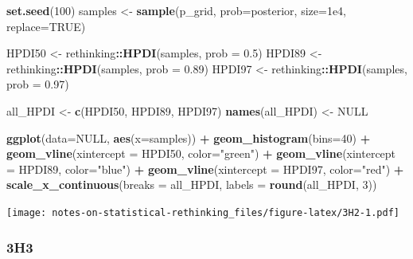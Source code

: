 \documentclass[
]{book}
\newenvironment{Shaded}{\begin{snugshade}}{\end{snugshade}}
\newcommand{\DataTypeTok}[1]{\textcolor[rgb]{0.13,0.29,0.53}{#1}}
\newcommand{\DecValTok}[1]{\textcolor[rgb]{0.00,0.00,0.81}{#1}}
\newcommand{\FloatTok}[1]{\textcolor[rgb]{0.00,0.00,0.81}{#1}}
\newcommand{\KeywordTok}[1]{\textcolor[rgb]{0.13,0.29,0.53}{\textbf{#1}}}
\newcommand{\NormalTok}[1]{#1}
\newcommand{\OperatorTok}[1]{\textcolor[rgb]{0.81,0.36,0.00}{\textbf{#1}}}
\newcommand{\OtherTok}[1]{\textcolor[rgb]{0.56,0.35,0.01}{#1}}
\newcommand{\StringTok}[1]{\textcolor[rgb]{0.31,0.60,0.02}{#1}}
\begin{document}
\begin{Shaded}
\begin{Highlighting}[]
\KeywordTok{set.seed}\NormalTok{(}\DecValTok{100}\NormalTok{)}
\NormalTok{samples \textless{}{-}}\StringTok{ }\KeywordTok{sample}\NormalTok{(p\_grid, }\DataTypeTok{prob=}\NormalTok{posterior, }\DataTypeTok{size=}\FloatTok{1e4}\NormalTok{, }\DataTypeTok{replace=}\OtherTok{TRUE}\NormalTok{)}

\NormalTok{HPDI50 \textless{}{-}}\StringTok{ }\NormalTok{rethinking}\OperatorTok{::}\KeywordTok{HPDI}\NormalTok{(samples, }\DataTypeTok{prob =} \FloatTok{0.5}\NormalTok{)}
\NormalTok{HPDI89 \textless{}{-}}\StringTok{ }\NormalTok{rethinking}\OperatorTok{::}\KeywordTok{HPDI}\NormalTok{(samples, }\DataTypeTok{prob =} \FloatTok{0.89}\NormalTok{)}
\NormalTok{HPDI97 \textless{}{-}}\StringTok{ }\NormalTok{rethinking}\OperatorTok{::}\KeywordTok{HPDI}\NormalTok{(samples, }\DataTypeTok{prob =} \FloatTok{0.97}\NormalTok{)}

\NormalTok{all\_HPDI \textless{}{-}}\StringTok{ }\KeywordTok{c}\NormalTok{(HPDI50, HPDI89, HPDI97)}
\KeywordTok{names}\NormalTok{(all\_HPDI) \textless{}{-}}\StringTok{ }\OtherTok{NULL}


\KeywordTok{ggplot}\NormalTok{(}\DataTypeTok{data=}\OtherTok{NULL}\NormalTok{, }\KeywordTok{aes}\NormalTok{(}\DataTypeTok{x=}\NormalTok{samples)) }\OperatorTok{+}\StringTok{ }
\StringTok{  }\KeywordTok{geom\_histogram}\NormalTok{(}\DataTypeTok{bins=}\DecValTok{40}\NormalTok{) }\OperatorTok{+}\StringTok{ }
\StringTok{  }\KeywordTok{geom\_vline}\NormalTok{(}\DataTypeTok{xintercept =}\NormalTok{ HPDI50, }\DataTypeTok{color=}\StringTok{"green"}\NormalTok{) }\OperatorTok{+}
\StringTok{  }\KeywordTok{geom\_vline}\NormalTok{(}\DataTypeTok{xintercept =}\NormalTok{ HPDI89, }\DataTypeTok{color=}\StringTok{"blue"}\NormalTok{) }\OperatorTok{+}\StringTok{ }
\StringTok{  }\KeywordTok{geom\_vline}\NormalTok{(}\DataTypeTok{xintercept =}\NormalTok{ HPDI97, }\DataTypeTok{color=}\StringTok{"red"}\NormalTok{) }\OperatorTok{+}
\StringTok{  }\KeywordTok{scale\_x\_continuous}\NormalTok{(}\DataTypeTok{breaks =}\NormalTok{ all\_HPDI, }\DataTypeTok{labels =} \KeywordTok{round}\NormalTok{(all\_HPDI, }\DecValTok{3}\NormalTok{))}
\end{Highlighting}
\end{Shaded}

\texttt{[image: notes-on-statistical-rethinking\_files/figure-latex/3H2-1.pdf]}

\hypertarget{h3-1}{%
\subsubsection*{3H3}\label{h3-1}}
\end{document}
